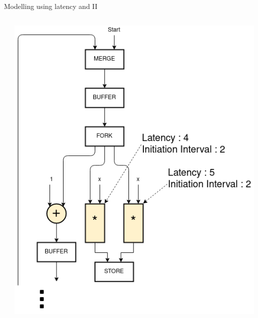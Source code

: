 \documentclass{beamer}
\begin{document}
\begin{frame}{Modelling using latency and II}
\begin{columns}[T]
\begin{column}{0.1\textwidth}
    \end{column}
    \begin{column}{0.25\textwidth}
        \begin{center}
      \includegraphics[scale=0.25]{latency_shared.png}
    \end{center}
    \end{column}
  \end{columns}
\end{frame}
\end{document}
